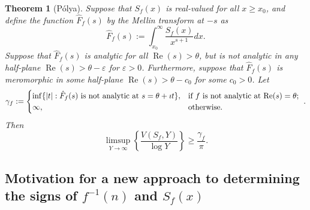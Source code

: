 \documentclass[11pt,reqno]{amsart}
\numberwithin{figure}{section}
\numberwithin{table}{section}
\renewcommand{\Re}{\operatorname{Re}}
\theoremstyle{plain}
\newtheorem{theorem}{Theorem}
\numberwithin{theorem}{section}
\theoremstyle{definition}
\begin{document}
\begin{theorem}[P\'olya] 
Suppose that $S_f(x)$ is real-valued for all $x \geq x_0$, and define the function 
$\hat{F}_f(s)$ by the Mellin transform at $-s$ as 
\[
\hat{F}_f(s) := \int_{x_0}^{\infty} \frac{S_f(x)}{x^{s+1}} dx. 
\]
Suppose that $\hat{F}_f(s)$ is analytic for all $\Re(s) > \theta$, but is not analytic 
in any half-plane $\Re(s) > \theta - \varepsilon$ for $\varepsilon > 0$. 
Furthermore, suppose that $\hat{F}_f(s)$ is meromorphic in some half-plane 
$\Re(s) > \theta - c_0$ for some $c_0 > 0$. Let 
\[
\gamma_f := \begin{cases} 
     \inf \{|t|: \hat{F}_f(s) \text{\ is not analytic at\ } s = \theta+\imath t\}, & \text{\rm
     if $f$ is not analytic at $\Re(s) = \theta$; } \\ 
     \infty, & \text{\rm otherwise.}
     \end{cases}. 
 \]
Then 
 \[
 \limsup_{Y \rightarrow \infty} \left\{\frac{V(S_f, Y)}{\log Y}\right\} \geq \frac{\gamma_f}{\pi}. 
\]
\end{theorem} 

\subsection{Motivation for a new approach to determining the signs of $f^{-1}(n)$ and $S_f(x)$} 
\end{document}
